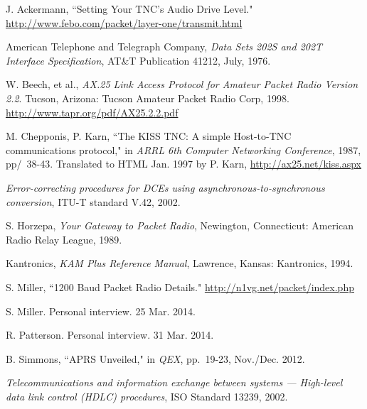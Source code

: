 \documentclass[12pt,letterpaper]{article}
\begin{document}
\begin{thebibliography}{99}

		J. Ackermann,
		``Setting Your TNC's Audio Drive Level."
		\url{http://www.febo.com/packet/layer-one/transmit.html}

		American Telephone and Telegraph Company,
		\emph{Data Sets 202S and 202T Interface Specification},
		AT\&T Publication 41212,
		July, 1976.

		W. Beech, et al.,
		\emph{AX.25 Link Access Protocol for Amateur Packet Radio Version 2.2}.
		Tucson, Arizona: Tucson Amateur Packet Radio Corp, 1998. 
		\url{http://www.tapr.org/pdf/AX25.2.2.pdf}
	
		M. Chepponis, P. Karn,
		``The KISS TNC: A simple Host-to-TNC communications protocol,"
		in \emph{ARRL 6th Computer Networking Conference},
		1987, pp/~38-43.
		Translated to HTML Jan. 1997 by P. Karn,
		\url{http://ax25.net/kiss.aspx}

		\emph{Error-correcting procedures for DCEs using 
		asynchronous-to-synchronous conversion}, ITU-T standard V.42, 2002.

		S. Horzepa,
		\emph{Your Gateway to Packet Radio},
		Newington, Connecticut: American Radio Relay League, 1989.

		Kantronics,
		\emph{KAM Plus Reference Manual},
		Lawrence, Kansas: Kantronics, 1994.

		S. Miller,
		``1200 Baud Packet Radio Details."
		\url{http://n1vg.net/packet/index.php}
	
		S. Miller. Personal interview. 25 Mar. 2014.

		R. Patterson. Personal interview. 31 Mar. 2014.

		B. Simmons,
		``APRS Unveiled," in \emph{QEX},
		pp.~19-23,
		Nov./Dec. 2012.

		\emph{Telecommunications and information
			exchange between systems --- High-level data link control (HDLC)
		procedures}, ISO Standard 13239, 2002.

\end{thebibliography}
\end{document}
